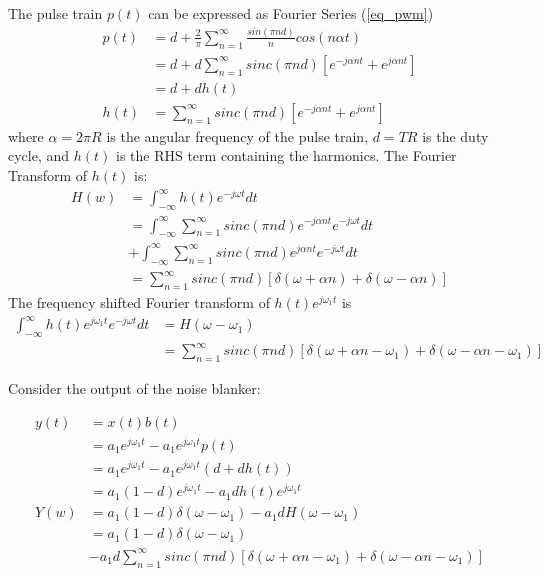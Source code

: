 \documentclass{article}
\begin{document}
The pulse train $p(t)$ can be expressed as Fourier Series (\ref{eq_pwm})
\begin{equation}
\begin{split}
p(t) &= d+\frac{2}{\pi} \sum_{n=1}^{\infty} \frac{sin(\pi n d)}{n}cos(n \alpha t) \\
     &= d + d \sum_{n=1}^{\infty} sinc(\pi n d) \left[ e^{-j\alpha n t} + e^{j \alpha n t} \right] \\
     &= d + d h(t) \\
h(t) &= \sum_{n=1}^{\infty} sinc(\pi n d) \left[ e^{-j\alpha n t} + e^{j \alpha n t} \right]  
\end{split}
\end{equation}
where $\alpha=2 \pi R$ is the angular frequency of the pulse train, $d=TR$ is the duty cycle, and $h(t)$ is the RHS term containing the harmonics.  The Fourier Transform of $h(t)$ is:
\begin{equation}
\begin{split}
H(w) &= \int_{-\infty}^{\infty}h(t)e^{-j \omega t}dt \\
     &= \int_{-\infty}^{\infty} \sum_{n=1}^{\infty} sinc(\pi n d) e^{-j\alpha n t}e^{-j \omega t}dt \\
     &+ \int_{-\infty}^{\infty} \sum_{n=1}^{\infty} sinc(\pi n d) e^{j\alpha n t}e^{-j \omega t}dt \\
     &= \sum_{n=1}^{\infty} sinc(\pi n d) \left[ \delta(\omega + \alpha n) + \delta(\omega - \alpha n) \right]
\end{split}
\end{equation}
The frequency shifted Fourier transform of $h(t)e^{j \omega_1 t}$ is
\begin{equation}
\begin{split}
\int_{-\infty}^{\infty} h(t)e^{j \omega_1 t} e^{-j \omega t}dt &= H(\omega-\omega_1) \\
  &= \sum_{n=1}^{\infty} sinc(\pi n d) \left[ \delta(\omega + \alpha n - \omega_1) + \delta(\omega - \alpha n - \omega_1) \right]
\end{split}
\end{equation}

Consider the output of the noise blanker:

\begin{equation}
\begin{split}
y(t) &= x(t)b(t) \\
     &= a_1 e^{j \omega_1 t} - a_1 e^{j \omega_1 t}p(t) \\
     &= a_1 e^{j \omega_1 t} - a_1 e^{j \omega_1 t}(d + dh(t)) \\    
     &= a_1 (1-d) e^{j \omega_1 t} - a_1 d h(t) e^{j \omega_1 t} \\    
Y(w) &= a_1 (1-d) \delta(\omega - \omega_1) - a_1 d H(\omega-\omega_1) \\
     &= a_1 (1-d) \delta(\omega - \omega_1) \\
     &- a_1 d \sum_{n=1}^{\infty} sinc(\pi n d) \left[ \delta(\omega + \alpha n - \omega_1) + \delta(\omega - \alpha n - \omega_1) \right]
\end{split}
\end{equation} 
\end{document}
